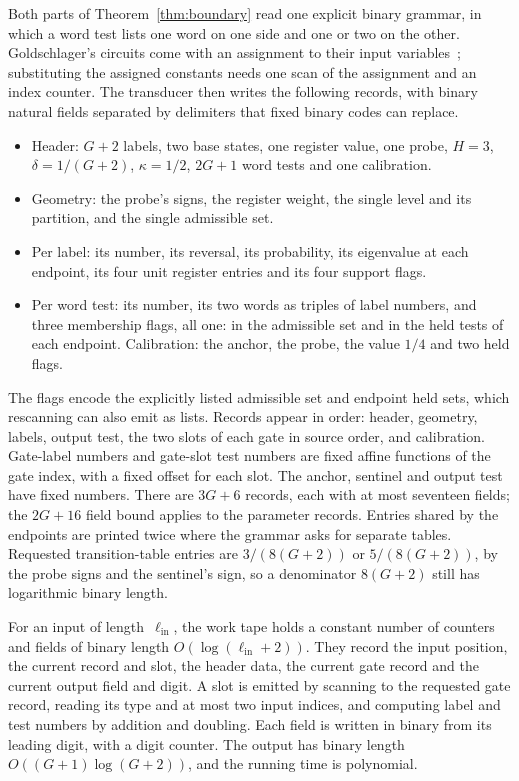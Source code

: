 Both parts of Theorem~\ref{thm:boundary} read one explicit binary grammar,
in which a word test lists one word on one side and one or two on the
other. Goldschlager's circuits come with an assignment to their input
variables~\cite{goldschlager}; substituting the assigned constants needs
one scan of the assignment and an index counter. The transducer then
writes the following records, with binary natural fields separated by
delimiters that fixed binary codes can replace.
\begin{itemize}
\item Header: $G+2$ labels, two base states, one register value, one
probe, $H=3$, $\delta=1/(G+2)$, $\kappa=1/2$, $2G+1$ word tests and one
calibration.
\item Geometry: the probe's signs, the register weight, the single level
and its partition, and the single admissible set.
\item Per label: its number, its reversal, its probability, its eigenvalue
at each endpoint, its four unit register entries and its four support
flags.
\item Per word test: its number, its two words as triples of label numbers,
and three membership flags, all one: in the admissible set and in the held
tests of each endpoint. Calibration: the anchor, the probe, the value
$1/4$ and two held flags.
\end{itemize}
The flags encode the explicitly listed admissible set and endpoint held
sets, which rescanning can also emit as lists. Records appear in order:
header, geometry, labels, output test, the two slots of each gate in source
order, and calibration. Gate-label numbers and gate-slot test numbers
are fixed affine functions of the gate index, with a fixed offset for each
slot. The anchor, sentinel and output test have fixed numbers. There are $3G+6$
records, each with at most seventeen fields; the $2G+16$ field bound
applies to the parameter records. Entries shared by the endpoints are
printed twice where the grammar asks for separate tables. Requested
transition-table entries are $3/(8(G+2))$ or $5/(8(G+2))$, by the probe
signs and the sentinel's sign, so a denominator $8(G+2)$ still has
logarithmic binary length.

For an input of length~$\ell_{\mathrm{in}}$, the work tape holds a constant
number of counters and fields of binary length
$O(\log(\ell_{\mathrm{in}}+2))$. They record the input position, the
current record and slot, the header data, the current gate record and the
current output field and digit. A slot is emitted by scanning to the requested gate
record, reading its type and at most two input indices, and computing
label and test numbers by addition and doubling. Each field is written in
binary from its leading digit, with a digit counter. The output has binary
length $O((G+1)\log(G+2))$, and the running time is polynomial.

